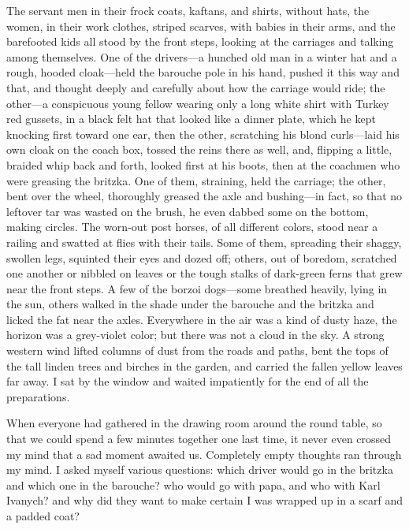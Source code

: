 The servant men in their frock coats, kaftans, and shirts, without hats, the women, in their work clothes, striped scarves, with babies in their arms, and the barefooted kids all stood by the front steps, looking at the carriages and talking among themselves. One of the drivers---a hunched old man in a winter hat and a rough, hooded cloak---held the barouche pole in his hand, pushed it this way and that, and thought deeply and carefully about how the carriage would ride; the other---a conspicuous young fellow wearing only a long white shirt with Turkey red gussets, in a black felt hat that looked like a dinner plate, which he kept knocking first toward one ear, then the other, scratching his blond curls---laid his own cloak on the coach box, tossed the reins there as well, and, flipping a little, braided whip back and forth, looked first at his boots, then at the coachmen who were greasing the britzka. One of them, straining, held the carriage;  the other, bent over the wheel, thoroughly greased the axle and bushing---in fact, so that no leftover tar was wasted on the brush, he even dabbed some on the bottom, making circles.  The worn-out post horses, of all different colors, stood near a railing and swatted at flies with their tails. Some of them, spreading their shaggy, swollen legs, squinted their eyes and dozed off; others, out of boredom, scratched one another or nibbled on leaves or the tough stalks of dark-green ferns that grew near the front steps. A few of the borzoi dogs---some breathed heavily, lying in the sun, others walked in the shade under the barouche and the britzka and licked the fat near the axles. Everywhere in the air was a kind of dusty haze, the horizon was a grey-violet color; but there was not a cloud in the sky. A strong western wind lifted columns of dust from the roads and paths, bent the tops of the tall linden trees and birches in the garden, and carried the fallen yellow leaves far away. I sat by the window and waited impatiently for the end of all the preparations.

When everyone had gathered in the drawing room around the round table, so that we could spend a few minutes together one last time, it never even crossed my mind that a sad moment awaited us. Completely empty thoughts ran through my mind. I asked myself various questions: which driver would go in the britzka and which one in the barouche? who would go with papa, and who with Karl Ivanych? and why did they want to make certain I was wrapped up in a scarf and a padded coat?

